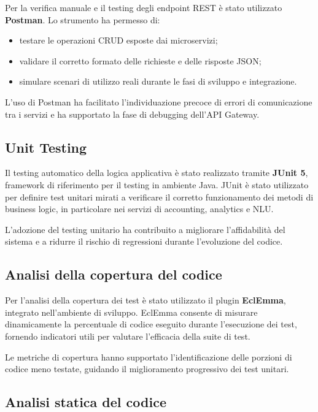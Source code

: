 Per la verifica manuale e il testing degli endpoint REST è stato utilizzato \textbf{Postman}.
Lo strumento ha permesso di:
\begin{itemize}
    \item testare le operazioni CRUD esposte dai microservizi;
    \item validare il corretto formato delle richieste e delle risposte JSON;
    \item simulare scenari di utilizzo reali durante le fasi di sviluppo e integrazione.
\end{itemize}

L’uso di Postman ha facilitato l’individuazione precoce di errori di comunicazione tra i servizi e ha supportato la fase di debugging dell’API Gateway.

\subsection{Unit Testing}

Il testing automatico della logica applicativa è stato realizzato tramite \textbf{JUnit 5}, framework di riferimento per il testing in ambiente Java.
JUnit è stato utilizzato per definire test unitari mirati a verificare il corretto funzionamento dei metodi di business logic, in particolare nei servizi di accounting, analytics e NLU.

L’adozione del testing unitario ha contribuito a migliorare l’affidabilità del sistema e a ridurre il rischio di regressioni durante l’evoluzione del codice.

\subsection{Analisi della copertura del codice}

Per l’analisi della copertura dei test è stato utilizzato il plugin \textbf{EclEmma}, integrato nell’ambiente di sviluppo.
EclEmma consente di misurare dinamicamente la percentuale di codice eseguito durante l’esecuzione dei test, fornendo indicatori utili per valutare l’efficacia della suite di test.

Le metriche di copertura hanno supportato l’identificazione delle porzioni di codice meno testate, guidando il miglioramento progressivo dei test unitari.

\subsection{Analisi statica del codice}

